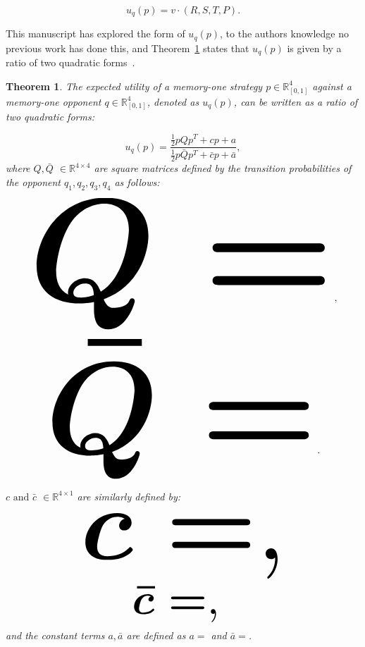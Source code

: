 \documentclass[fleqn,10pt]{wlscirep}
\newcommand{\R}{\mathbb{R}}
\newtheorem{theorem}{Theorem}
\providecommand{\DIFadd}[1]{{\protect\color{blue}\uwave{#1}}} %
\providecommand{\DIFaddbegin}{} %
\providecommand{\DIFaddend}{} %
\begin{document}
\begin{equation}\label{eq:press_dyson_utility}
    u_q(p) = v \cdot (R, S, T, P).
\end{equation}

This manuscript has explored the form of \(u_q(p)\), to the \DIFaddbegin \DIFadd{best of the }\DIFaddend authors knowledge no
previous work has done this, and Theorem~\ref{theorem_one} states that \(u_q(p)\) is given by a ratio
of two quadratic forms~\cite{kepner2011}.

\begin{theorem}\label{theorem_one}
    The expected utility of a memory-one strategy \(p\in\mathbb{R}_{[0,1]}^4\)
    against a memory-one opponent \(q\in\mathbb{R}_{[0,1]}^4\), denoted
    as \(u_q(p)\), can be written as a ratio of two quadratic forms:

    \begin{equation}\label{eq:optimisation_quadratic}
    u_q(p) = \frac{\frac{1}{2}pQp^T + cp + a}{\frac{1}{2}p\bar{Q}p^T + \bar{c}p + \bar{a}},
    \end{equation}
    where \(Q, \bar{Q}\) \(\in \R^{4\times4}\) are square matrices defined by the
    transition probabilities of the opponent \(q_1, q_2, q_3, q_4\) as follows:

    \begin{center}
    \begin{equation}
    \resizebox{0.9\linewidth}{!}{\arraycolsep=2.5pt%
    \boldmath\(
    Q = \)},
    \end{equation}
    \begin{equation}\label{eq:q_bar_matrix}
    \resizebox{0.8\linewidth}{!}{\arraycolsep=2.5pt%
    \boldmath\(
    \bar{Q} =  \)}.
    \end{equation}
    \end{center}

    \(c \text{ and } \bar{c}\) \(\in \R^{4 \times 1}\) are similarly defined by:

    \begin{equation}\label{eq:q_matrix_numerator}
    \resizebox{0.6\linewidth}{!}{\arraycolsep=2.5pt%
    \boldmath\(c = \),}
    \end{equation}
    \begin{equation}\label{eq:q_matrix_denominator}
    \resizebox{0.3\linewidth}{!}{\arraycolsep=2.5pt%
    \boldmath\(\bar{c} = \),
    }
    \end{equation}
    and the constant terms \(a, \bar{a}\) are defined as \(a = \) and
    \(\bar{a} = \).
\end{theorem}
\end{document}
